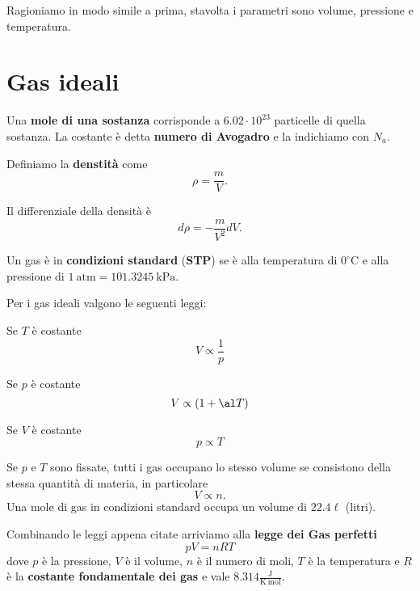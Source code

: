 \begin{example}[Fluidi]
Ragioniamo in modo simile a prima, stavolta i parametri sono volume, pressione e temperatura.
\end{example}

\section{Gas ideali}

\begin{definition}[Mole]
Una \textbf{mole di una sostanza} corrisponde a $6.02\cdot 10^{23}$ particelle di quella sostanza. La costante \`e detta \textbf{numero di Avogadro} e la indichiamo con $N_a$. 
\end{definition}

\begin{definition}[Densit\`a]
Definiamo la \textbf{denstit\`a} come
\[\rho=\frac mV.\]
\end{definition}
\begin{remark}
Il differenziale della densit\`a \`e
\[d\rho=-\frac m{V^2}dV.\]
\end{remark}

\begin{definition}
Un gas \`e in \textbf{condizioni standard} (\textbf{STP}) se \`e alla temperatura di $0^\circ\mathrm C$ e alla pressione di $1\ \mathrm{atm}=101.3245\ \mathrm{kPa}$.
\end{definition}

\noindent Per i gas ideali valgono le seguenti leggi:
\begin{fact}
Se $T$ \`e costante
\[V\propto \frac1p\]
\end{fact}
\begin{fact}
Se $p$ \`e costante
\[V\propto (1+\al T)\]
\end{fact}
\begin{fact}
Se $V$ \`e costante
\[p\propto T\]
\end{fact}
\begin{fact}
Se $p$ e $T$ sono fissate, tutti i gas occupano lo stesso volume se consistono della stessa quantit\`a di materia, in particolare
\[V\propto n.\]
Una mole di gas in condizioni standard occupa un volume di $22.4\ell$ (litri).
\end{fact}

\noindent Combinando le leggi appena citate arriviamo alla \textbf{legge dei Gas perfetti}
\[\boxed{pV=nRT}\]
dove $p$ \`e la pressione, $V$ \`e il volume, $n$ \`e il numero di moli, $T$ \`e la temperatura e $R$ \`e la \textbf{costante fondamentale dei gas} e vale $8.314 \frac{\mathrm{J}}{\mathrm{K}\ \mathrm{mol}}$.

